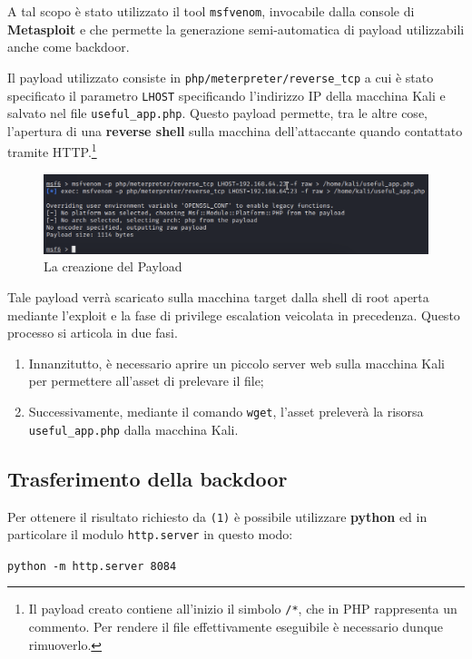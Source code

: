 \documentclass[a4paper, 12pt, oneside]{article}
\begin{document}
A tal scopo è stato utilizzato il tool \texttt{msfvenom}, invocabile dalla console di \textbf{Metasploit} e che permette la generazione semi-automatica di payload utilizzabili anche come backdoor.\cite{msfvenom}

Il payload utilizzato consiste in \texttt{php/meterpreter/reverse\_tcp} a cui è stato specificato il parametro \texttt{LHOST} specificando l'indirizzo IP della macchina Kali e salvato nel file \texttt{useful\_app.php}. Questo payload permette, tra le altre cose, l'apertura di una \textbf{reverse shell} sulla macchina dell'attaccante quando contattato tramite HTTP.\footnote{Il payload creato contiene all'inizio il simbolo \texttt{/*}, che in PHP rappresenta un commento. Per rendere il file effettivamente eseguibile è necessario dunque rimuoverlo.}

\begin{figure}[h!]
    \centering
    \includegraphics[width=\textwidth]{img/msfvenom.png}
    \caption{La creazione del Payload}
\end{figure}

Tale payload verrà scaricato sulla macchina target dalla shell di root aperta mediante l'exploit e la fase di privilege escalation veicolata in precedenza. Questo processo si articola in due fasi.

\begin{enumerate}
    \item Innanzitutto, è necessario aprire un piccolo server web sulla macchina Kali per permettere all'asset di prelevare il file;
    \item Successivamente, mediante il comando \texttt{wget}, l'asset preleverà la risorsa \texttt{useful\_app.php} dalla macchina Kali.
\end{enumerate}

\subsection{Trasferimento della backdoor}
Per ottenere il risultato richiesto da \texttt{(1)} è possibile utilizzare \textbf{python} ed in particolare il modulo \texttt{http.server} in questo modo:

\begin{center}
    \texttt{python -m http.server 8084}
\end{center}
\end{document}
